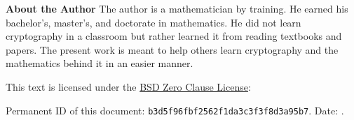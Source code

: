 \noindent
\textbf{About the Author}
The author is a mathematician by training.
He earned his bachelor's, master's, and doctorate in mathematics.
He did not learn cryptography in a classroom but rather
learned it from reading textbooks and papers.
The present work is meant to help others learn cryptography
and the mathematics behind it in an easier manner.

\vfill

\noindent
This text is licensed under the
\href{https://spdx.org/licenses/0BSD.html}{BSD Zero Clause License}:



\noindent
Permanent ID of this document:
\texttt{b3d5f96fbf2562f1da3c3f3f8d3a95b7}.
Date: {\DTMtoday}.

\thispagestyle{plain}
\clearpage
